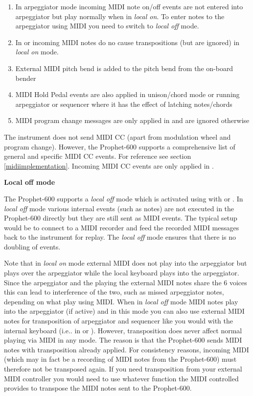 \begin{enumerate}
  \setlength\itemsep{0cm}
  \item In arpeggiator mode incoming MIDI note on/off events are not entered into arpeggiator but play normally when in \textit{local on}. To enter notes to the arpeggiator using MIDI you need to switch to \textit{local off} mode. 
  \item In \shiftmode or \shiftlock incoming MIDI notes do no cause transpositions (but are ignored) in \textit{local on} mode. 
  \item External MIDI pitch bend is added to the pitch bend from the on-board bender 
  \item MIDI Hold Pedal events are also applied in unison/chord mode or running arpeggiator or sequencer where it has the effect of latching notes/chords
  \item MIDI program change messages are only applied in \presetmode and are ignored otherwise  
\end{enumerate}

The instrument does not send MIDI CC (apart from modulation wheel and program change). However, the Prophet-600 supports a comprehensive list of general and specific MIDI CC events. For reference see section \ref{midiimplementation}. Incoming MIDI CC events are only applied in \presetmode.

\textbf{Local off mode}

The Prophet-600 supports a \textit{local off} mode which is activated using  with \shiftmode or \shiftlock. In \textit{local off} mode various internal events (such as notes) are not executed in the Prophet-600 directly but they are still sent as MIDI events. The typical setup would be to connect to a MIDI recorder and feed the recorded MIDI messages back to the instrument for replay. The \textit{local off} mode ensures that there is no doubling of events.

Note that in \textit{local on} mode external MIDI does not play into the arpeggiator but plays over the arpeggiator while the local keyboard plays into the arpeggiator. Since the arpeggiator and the playing the external MIDI notes share the 6 voices this can lead to interference of the two, such as missed arpeggiator notes, depending on what play using MIDI. When in \textit{local off} mode MIDI notes play into the arpeggiator (if active) and in this mode you can also use external MIDI notes for transposition of arpeggiator and sequencer like you would with the internal keyboard (i.e.. in \shiftmode or \shiftlock). However, transposition does never affect normal playing via MIDI in any mode. The reason is that the Prophet-600 sends MIDI notes with transposition already applied. For consistency reasons, incoming MIDI (which may in fact be a recording of MIDI notes from the Prophet-600) must therefore not be transposed again. If you need transposition from your external MIDI controller you would need to use whatever function the MIDI controlled provides to transpose the MIDI notes sent to the Prophet-600.

